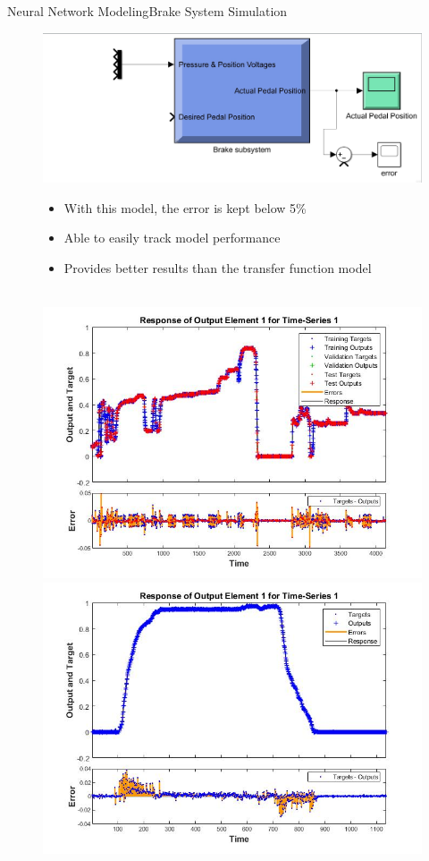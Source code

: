\documentclass{beamer}
\begin{document}
\begin{frame}{Neural Network Modeling}{Brake System Simulation}
	\begin{block}{}
\begin{figure}[H]
  			\centering \includegraphics[width=.48\linewidth , height=.37\textheight]{figs/img/newBrakeSimulinkBlock.jpg}\quad%
			\centering \begin{minipage}[b][0.4\textheight][c]{.45\linewidth}  \begin{itemize}
			\item With this model, the error is kept below 5\%
			\item Able to easily track model performance
			\item Provides better results than the transfer function model
			\end{itemize} \end{minipage}\\[1em]
			\centering \includegraphics[width=.45\linewidth , height=.37\textheight]{figs/img/brake_new_neuralNetworkFig.jpg}\quad%
			\centering \includegraphics[width=.45\linewidth , height=.37\textheight]{figs/img/brake_new_neuralNetworkFigLog2Test.jpg}
  		\end{figure}
	
  \end{block}
\end{frame}
\end{document}
